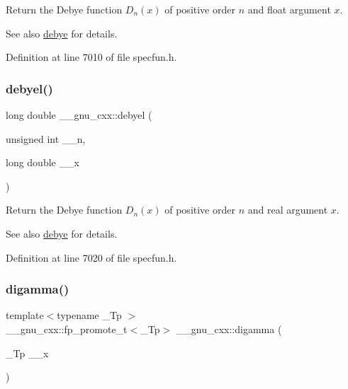 Return the Debye function $ D_n(x) $ of positive order $ n $ and {\ttfamily float} argument $ x $.

\begin{DoxySeeAlso}{See also}
\hyperlink{group__gnu__math__spec__func_ga0b14de47c011de3ebf771c9f29b2b78c}{debye} for details. 
\end{DoxySeeAlso}


Definition at line 7010 of file specfun.\+h.

\mbox{\label{group__gnu__math__spec__func_ga2db11e767b89bbd36be6ebfadda3401f}} 
\subsubsection{\texorpdfstring{debyel()}{debyel()}}
{\footnotesize\ttfamily long double \+\_\+\+\_\+gnu\+\_\+cxx\+::debyel (\begin{DoxyParamCaption}\item[{unsigned int}]{\+\_\+\+\_\+n,  }\item[{long double}]{\+\_\+\+\_\+x }\end{DoxyParamCaption})\hspace{0.3cm}{\ttfamily [inline]}}

Return the Debye function $ D_n(x) $ of positive order $ n $ and real argument $ x $.

\begin{DoxySeeAlso}{See also}
\hyperlink{group__gnu__math__spec__func_ga0b14de47c011de3ebf771c9f29b2b78c}{debye} for details. 
\end{DoxySeeAlso}


Definition at line 7020 of file specfun.\+h.

\mbox{\label{group__gnu__math__spec__func_ga7b87300edf8754d959e1d94fe0c9246e}} 
\subsubsection{\texorpdfstring{digamma()}{digamma()}}
{\footnotesize\ttfamily template$<$typename \+\_\+\+Tp $>$ \\
\+\_\+\+\_\+gnu\+\_\+cxx\+::fp\+\_\+promote\+\_\+t$<$\+\_\+\+Tp$>$ \+\_\+\+\_\+gnu\+\_\+cxx\+::digamma (\begin{DoxyParamCaption}\item[{\+\_\+\+Tp}]{\+\_\+\+\_\+x }\end{DoxyParamCaption})\hspace{0.3cm}{\ttfamily [inline]}}

